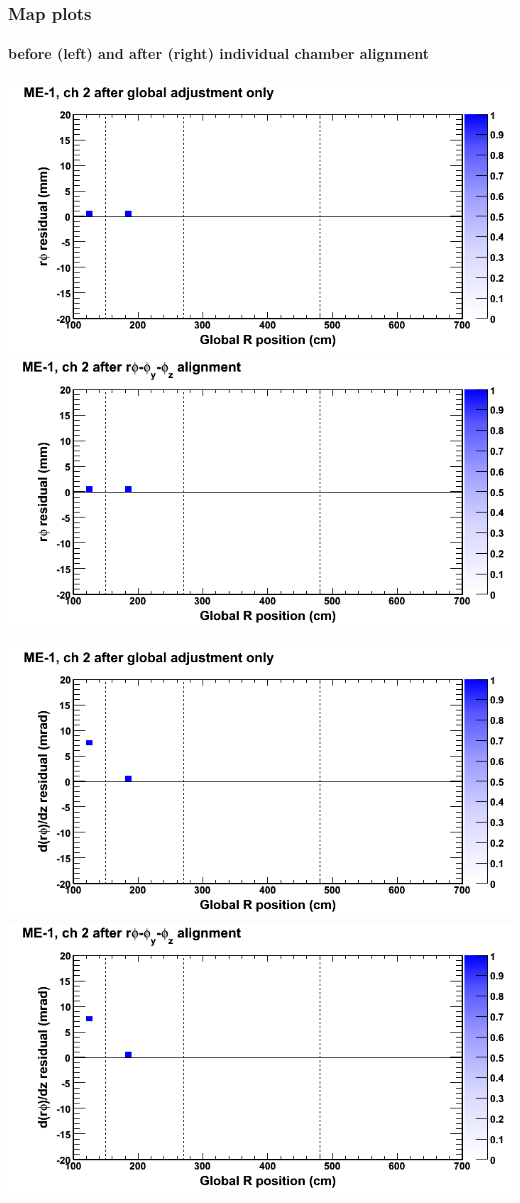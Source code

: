 \documentclass[compress]{beamer}
\begin{document}
\begin{frame}
\frametitle{Map plots}
\framesubtitle{before (left) and after (right) individual chamber alignment}
\includegraphics[width=0.5\linewidth]{ringmapplots_3dof/before_CSCvsr_mem1ch02_x.png} \includegraphics[width=0.5\linewidth]{ringmapplots_3dof/after_CSCvsr_mem1ch02_x.png}

\includegraphics[width=0.5\linewidth]{ringmapplots_3dof/before_CSCvsr_mem1ch02_dxdz.png} \includegraphics[width=0.5\linewidth]{ringmapplots_3dof/after_CSCvsr_mem1ch02_dxdz.png}
\end{frame}
\end{document}
